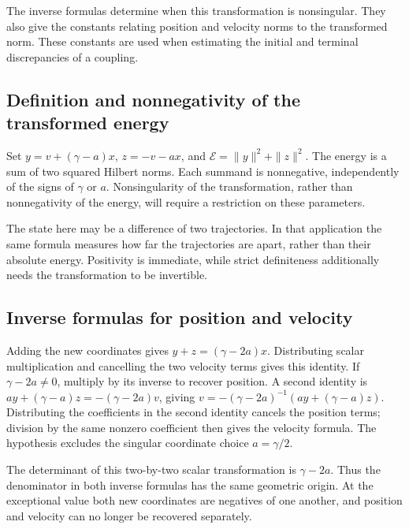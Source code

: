 \documentclass[11pt,a4paper]{report}
\begin{document}
The inverse formulas determine when this transformation is nonsingular. They also give the constants relating position and velocity norms to the transformed norm. These constants are used when estimating the initial and terminal discrepancies of a coupling.

\subsection{\texorpdfstring{Definition and nonnegativity of the transformed energy}{Definition and nonnegativity of the transformed energy}}
\label{report-step-KineticLangevin-Geometry-lean-1}


Set \(y=v+(\gamma-a)x\), \(z=-v-ax\), and \(\mathcal E=\|y\|^2+\|z\|^2\). The energy is a sum of two squared Hilbert norms. Each summand is nonnegative, independently of the signs of \(\gamma\) or \(a\). Nonsingularity of the transformation, rather than nonnegativity of the energy, will require a restriction on these parameters.



The state here may be a difference of two trajectories. In that application the same formula measures how far the trajectories are apart, rather than their absolute energy. Positivity is immediate, while strict definiteness additionally needs the transformation to be invertible.

\subsection{\texorpdfstring{Inverse formulas for position and velocity}{Inverse formulas for position and velocity}}
\label{report-step-KineticLangevin-Geometry-lean-2}


Adding the new coordinates gives \(y+z=(\gamma-2a)x\). Distributing scalar multiplication and cancelling the two velocity terms gives this identity. If \(\gamma-2a\ne0\), multiply by its inverse to recover position. A second identity is \(ay+(\gamma-a)z=-(\gamma-2a)v\), giving \(v=-(\gamma-2a)^{-1}(ay+(\gamma-a)z)\). Distributing the coefficients in the second identity cancels the position terms; division by the same nonzero coefficient then gives the velocity formula. The hypothesis excludes the singular coordinate choice \(a=\gamma/2\).



The determinant of this two-by-two scalar transformation is \(\gamma-2a\). Thus the denominator in both inverse formulas has the same geometric origin. At the exceptional value both new coordinates are negatives of one another, and position and velocity can no longer be recovered separately.
\end{document}
